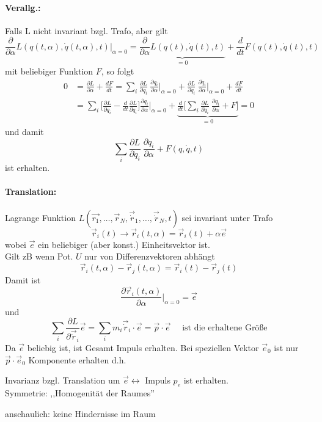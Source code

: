 \documentclass[titlepage,12pt,a4paper,ngerman]{report}
\newcommand{\tx}[1]{\textrm{#1}}
\newcommand{\rbox}[1]{\begin{tcolorbox}[colback=white,colframe=red!75!black]#1\end{tcolorbox}} %
\begin{document}
\paragraph{Verallg.:} Falls L nicht invariant bzgl. Trafo, aber gilt $$\frac{\partial}{\partial \alpha} L(q(t, \alpha), \dot q (t, \alpha), t) \bigg|_{\alpha = 0} = \underbrace{\frac{\partial}{\partial \alpha} L (q(t), \dot q (t), t)}_{= 0} + \frac{d}{dt}F(q(t), \dot q (t), t)$$
mit beliebiger Funktion $F$, so folgt
\begin{align*}
0 &= \frac{\partial L}{\partial \alpha} + \frac{dF}{dt} = \sum_i \frac{\partial L}{\partial q_i}\ \frac{\partial q_i}{\partial \alpha}\bigg|_{\alpha=0} + \frac{\partial L}{\partial \dot q_i}\ \frac{\partial \dot q_i}{\partial \alpha}\bigg|_{\alpha=0} + \frac{dF}{dt}\\
&= \sum_i \bigg[ \frac{\partial L}{\partial q_i} - \frac{d}{dt} \frac{\partial L}{\partial \dot q_i} \bigg] \frac{\partial q_i}{\partial \alpha} \bigg|_{\alpha = 0} +  \underbrace{\frac{d}{dt} \bigg[ \sum_i \frac{\partial L}{\partial \dot q_i}\ \frac{\partial q_i}{\partial \alpha} + F \bigg]}_{= 0} = 0
\end{align*}
und damit 
\begin{equation*}
\sum_i \frac{\partial L}{\partial \dot q_i}\ \frac{\partial q_i}{\partial \alpha} + F(q, \dot q, t) \tag{$*$}
\end{equation*}
ist erhalten.
\paragraph{Translation:} Lagrange Funktion $L(\vec{r_1}, \dots , \vec{r}_N, \vec{\dot r}_1, \dots, \vec{\dot r}_N, t)$ sei invariant unter Trafo
$$\vec{r}_i (t) \rightarrow \vec{r}_i (t,\alpha) = \vec{r}_i (t) + \alpha\vec{e}$$
wobei $\vec{e}$ ein beliebiger (aber konst.) Einheitsvektor ist.\\
Gilt zB wenn Pot. $U$ nur von Differenzvektoren abhängt
$$\vec{r}_i (t, \alpha) - \vec{r}_j (t, \alpha) = \vec{r}_i (t) - \vec{r}_j (t)$$
Damit ist $$\frac{\partial \vec{r}_i (t,\alpha)}{\partial \alpha} \bigg|_{\alpha = 0} = \vec{e}$$
und $$\sum_i \frac{\partial L}{\partial \vec{\dot r}_i} \vec{e} = \sum_i m_i \vec{\dot r}_i \cdot \vec{e} = \vec{p} \cdot \vec{e} \quad \tx{ ist die erhaltene Größe}$$
Da $\vec{e}$ beliebig ist, ist Gesamt Impuls erhalten. Bei speziellen Vektor $\vec{e}_0$ ist nur $\vec{p} \cdot \vec{e}_0$ Komponente erhalten d.h.\\
\rbox{
	Invarianz bzgl. Translation um $\vec{e} \leftrightarrow$ Impuls $p_e$ ist erhalten.\\
	Symmetrie: ,,Homogenität der Raumes''
}
anschaulich: keine Hindernisse im Raum
\end{document}
